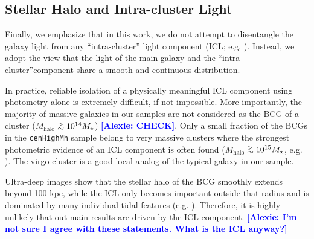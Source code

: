 \documentclass[a4paper,fleqn,usenatbib]{mnras}
\def\simgt{\lower.5ex\hbox{$\; \buildrel > \over {\sim} \;$}}
\def\rbcg{\texttt{cenHighMh}}
\def\mhalo{{$M_{\mathrm{halo}}$}}
\newcommand{\alexie}[1]{\textcolor{blue}{\textbf{[Alexie: #1]}}}
\begin{document}


\subsection{Stellar Halo and Intra-cluster Light}     
      
    Finally, we emphasize that in this work, we do not attempt  to  disentangle the galaxy light from any ``intra-cluster'' light component (ICL; e.g. 
    \citealt{Carlberg1997, Lin2004, Gonzalez2005, Mihos2005}). Instead, we adopt the view that the light of the main galaxy and the 
    ``intra-cluster''component share a smooth and continuous distribution. 
    
    In practice, reliable isolation of a physically meaningful ICL component using 
    photometry alone is extremely difficult, if not impossible. 
    More importantly, the majority of massive galaxies in our samples are not considered 
    as the BCG of a cluster (\mhalo{}$\simgt 10^{14}M_{\star}$) \alexie{CHECK}. 
    Only a small fraction of the BCGs in the \rbcg{} sample belong to very 
    massive clusters where the strongest photometric evidence of an ICL component is 
    often found (\mhalo{}$\simgt 10^{15}M_{\star}$, e.g. \citealt{Presotto2014, 
    Burke2015}). The virgo cluster is a good  local analog of the typical galaxy in our sample. 
    
 
    Ultra-deep images show that the stellar halo of the BCG smoothly extends beyond 
    100 kpc, while the ICL only becomes important outside that radius and is dominated 
    by many individual tidal features (e.g. \citealt{Mihos2016}).
    Therefore, it is highly unlikely that out main results are driven by the ICL component. \alexie{I'm not sure I agree with these statements. What is the ICL anyway?}
\end{document}
